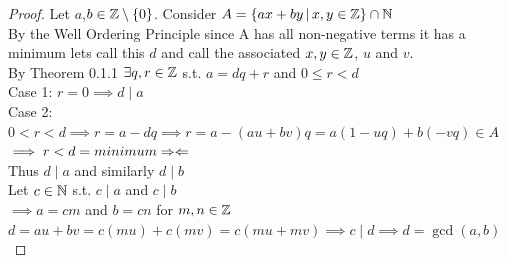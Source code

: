 \begin{proof}
    Let \(a\),\(b\in\mathbb{Z}\setminus\left\{ 0 \right\}\). Consider \(A= \left\{ax+by \,|\, x,y\in\mathbb{Z} \right\}\cap\mathbb{N}\)\\
    By the Well Ordering Principle since A has all non-negative terms it has a minimum lets call this \(d\) and call the associated \(x,y\in\mathbb{Z}\), \(u\) and \(v\).\\
    By Theorem 0.1.1 \(\exists q,r \in\mathbb{Z}\) s.t. \(a=dq+r\) and \(0\leq r < d\)\\
    Case 1: \(r=0 \implies d\mid a\)\\
    Case 2: \(0 < r < d \implies r=a-dq \implies r=a-(au+bv)q=a(1-uq)+b(-vq)\in A\)\\
    \(\implies r<d=minimum \Rightarrow \Leftarrow\)\\
    Thus \(d \mid a\) and similarly \(d \mid b\)\\
    Let \(c\in\mathbb{N}\) s.t. \(c\mid a\) and \(c\mid b\)\\
    \(\implies a=cm\) and \(b=cn\) for \(m,n\in\mathbb{Z}\)\\
    \(d=au+bv=c(mu)+c(mv)=c(mu+mv)\implies c \mid d \implies d=\gcd\left( a,b \right)\)
\end{proof}
\newpage
